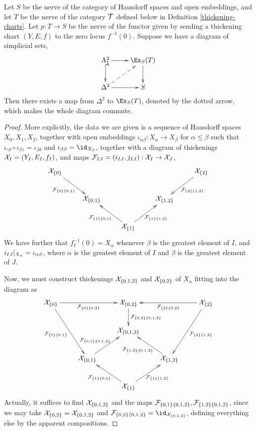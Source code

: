 \begin{prop}\label{lifting-21-horns}
Let $S$ be the nerve of the category of Hausdorff spaces and open embeddings, and let $T$ be the nerve of the category $\mathcal T$ defined below in Definition \ref{thickening-charts}. Let $p: T \to S$ be the nerve of the functor given by sending a thickening chart $(Y, E, f)$ to the zero locus $f^{-1}(0)$. Suppose we have a diagram of simplicial sets,
\[\xymatrix{
\Lambda^2_1 \ar@{^{(}->}[d] \ar[r] & \Ex_S(T) \ar[d] \\
\Delta^2 \ar[r] \ar@{-->}[ur] & S
}\]
Then there exists a map from $\Delta^2$ to $\Ex_S(T)$, denoted by the dotted arrow, which makes the whole diagram commute.
\end{prop}

\begin{proof}

More explicitly, the data we are given is a sequence of Hausdorff spaces $X_0, X_1, X_2$, together with open embeddings $\iota_{\alpha \beta}: X_\alpha \to X_\beta$ for $\alpha \leq \beta$ such that $\iota_{\gamma \delta} \circ \iota_{\beta \gamma} = \iota_{\beta \delta}$ and $\iota_{\beta \beta} = \id_{X_\beta}$, together with a diagram of thickenings $\mathcal X_I = (Y_I, E_I, f_I)$, and maps $\mathcal F_{IJ} = (i_{IJ}, j_{IJ}): \mathcal X_I \to \mathcal X_J$,
\[\xymatrix{
\cX_{\{0\}} \ar[dr]_-{\cF_{\{0\}\{0,1\}}} & & & & \cX_{\{2\}} \ar[dl]^-{\cF_{\{2\}\{1,2\}}} \\
& \cX_{\{0, 1\}} & & \cX_{\{1,2\}} & \\
& & \cX_{\{1\}} \ar[ul]^-{\cF_{\{1\}\{0,1\}}} \ar[ur]_-{\cF_{\{1\}\{1,2\}}} & &
}\]
We have further that $f_I^{-1}(0) = X_\alpha$ whenever $\beta$ is the greatest element of $I$, and ${i_{I J}|_{X_\alpha}} = \iota_{\alpha \beta}$, where $\alpha$ is the greatest element of $I$ and $\beta$ is the greatest element of $J$.

Now, we must construct thickenings $\mathcal X_{\{0,1,2\}}$ and $\mathcal X_{\{0,2\}}$ of $X_n$ fitting into the diagram as
\[\xymatrix{
\cX_{\{0\}} \ar[ddr]_-{\cF_{\{0\}\{0,1\}}} \ar[rr]_-{\cF_{\{0\}\{0,2\}}} & & \cX_{\{0, 2\}} \ar[d]^-{\cF_{\{0, 2\}\{0,1,2\}}} & & \cX_{\{2\}} \ar[ddl]^-{\cF_{\{2\}\{1,2\}}} \ar[ll]^-{\cF_{\{2\}\{0,2\}}} \\
& & \cX_{\{0,1,2\}} & & \\
& \cX_{\{0, 1\}} \ar[ur]^-{\cF_{\{0, 1\}\{0,1,2\}}} & & \cX_{\{1,2\}} \ar[ul]^-{\cF_{\{1, 2\}\{0,1,2\}}} & \\
& & \cX_{\{1\}} \ar[ul]^-{\cF_{\{1\}\{0,1\}}} \ar[ur]_-{\cF_{\{1\}\{1,2\}}} & &
}\]
Actually, it suffices to find $\mathcal X_{\{0, 1, 2\}}$ and the maps $\mathcal F_{\{0,1\}\{0,1,2\}}, \mathcal F_{\{1, 2\}\{0,1,2\}}$, since we may take $\mathcal X_{\{0, 2\}} = \mathcal X_{\{0, 1, 2\}}$ and $\cF_{\{0,2\}\{0,1,2\}} = \id_{\cX_{\{0, 1, 2\}}}$, defining everything else by the apparent compositions.


\end{proof}
